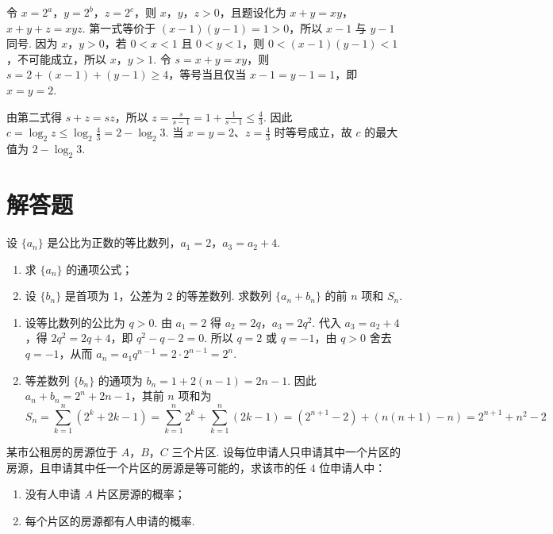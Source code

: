 \begin{solution}
令 \(x=2^{a}\)，\(y=2^{b}\)，\(z=2^{c}\)，则 \(x\)，\(y\)，\(z>0\)，且题设化为
\(x+y=xy\)，\(x+y+z=xyz\). 第一式等价于 \((x-1)(y-1)=1>0\)，所以 \(x-1\) 与 \(y-1\) 同号. 因为 \(x\)，\(y>0\)，若 \(0<x<1\) 且 \(0<y<1\)，则 \(0<(x-1)(y-1)<1\)，不可能成立，所以 \(x\)，\(y>1\). 令 \(s=x+y=xy\)，则
\(s=2+(x-1)+(y-1)\geq4\)，等号当且仅当 \(x-1=y-1=1\)，即 \(x=y=2\).

由第二式得 \(s+z=sz\)，所以
\(z=\frac{s}{s-1}=1+\frac1{s-1}\leq\frac43\). 因此
\(c=\log_{2}z\leq\log_{2}\frac43=2-\log_{2}3\). 当 \(x=y=2\)、\(z=\frac43\) 时等号成立，故 \(c\) 的最大值为 \(2-\log_{2}3\).
\end{solution}

\section{解答题}

\begin{problem}
设 \(\{a_{n}\}\) 是公比为正数的等比数列，\(a_{1} = 2\)，\(a_{3} = a_{2} + 4\).
\begin{enumerate}
\item 求 \( \{a_{n}\} \) 的通项公式；
\item 设 \( \{b_{n}\} \) 是首项为 1，公差为 2 的等差数列. 求数列 \( \{a_{n} + b_{n}\} \) 的前 \(n\) 项和 \(S_{n}\).
\end{enumerate}
\end{problem}

\begin{solution}
\begin{enumerate}
\item 设等比数列的公比为 \(q>0\). 由 \(a_{1}=2\) 得 \(a_{2}=2q\)，\(a_{3}=2q^{2}\). 代入 \(a_{3}=a_{2}+4\)，得
\(2q^{2}=2q+4\)，即 \(q^{2}-q-2=0\). 所以 \(q=2\) 或 \(q=-1\)，由 \(q>0\) 舍去 \(q=-1\)，从而
\(a_{n}=a_{1}q^{n-1}=2\cdot2^{n-1}=2^{n}\).
\item 等差数列 \(\{b_{n}\}\) 的通项为
\(b_{n}=1+2(n-1)=2n-1\). 因此
\(a_{n}+b_{n}=2^{n}+2n-1\)，其前 \(n\) 项和为
\[
S_{n}=\sum_{k=1}^{n}(2^{k}+2k-1)
=\sum_{k=1}^{n}2^{k}+\sum_{k=1}^{n}(2k-1)
=(2^{n+1}-2)+(n(n+1)-n)
=2^{n+1}+n^{2}-2
\]
\end{enumerate}
\end{solution}

\begin{problem}
某市公租房的房源位于 \(A\)，\(B\)，\(C\) 三个片区. 设每位申请人只申请其中一个片区的房源，且申请其中任一个片区的房源是等可能的，求该市的任 \(4\) 位申请人中：
\begin{enumerate}
\item 没有人申请 \(A\) 片区房源的概率；
\item 每个片区的房源都有人申请的概率.
\end{enumerate}
\end{problem}

